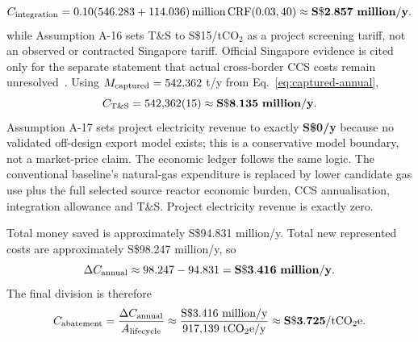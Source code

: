 \begin{equation}\label{eq:integration-cost}
C_{\rm integration}=0.10(546.283+114.036)\,\mathrm{million}\,\mathrm{CRF}(0.03,40)\approx\mathbf{S\$2.857~million/y}.
\end{equation}
while Assumption A-16 sets T\&S to S\$15/tCO$_2$ as a project screening tariff, not an observed or contracted Singapore tariff. Official Singapore evidence is cited only for the separate statement that actual cross-border CCS costs remain unresolved~\cite{mticcs2025cost}. Using $M_{\rm captured}=542{,}362$ t/y from Eq.~\ref{eq:captured-annual},
\begin{equation}\label{eq:ts-cost}
C_{\rm T\&S}=542{,}362(15)
\approx\mathbf{S\$8.135~million/y}.
\end{equation}
Assumption A-17 sets project electricity revenue to exactly \textbf{S\$0/y} because no validated off-design export model exists; this is a conservative model boundary, not a market-price claim.
The economic ledger follows the same logic. The conventional baseline's natural-gas expenditure is replaced by lower candidate gas use plus the full selected source reactor economic burden, CCS annualisation, integration allowance and T\&S. Project electricity revenue is exactly zero.

\begin{table}[htbp]\centering\scriptsize
\caption{Canonical annual-cost ledger generated by Rust for the zero-electricity-credit model boundary.}
\label{tab:cost-ledger}
\end{table}

Total money saved is approximately S\$94.831 million/y.  Total new represented costs are approximately S\$98.247 million/y, so
\begin{equation}\label{eq:annual-incremental-cost}
\Delta C_{\rm annual}
\approx98.247-94.831
=\mathbf{S\$3.416~million/y}.
\end{equation}
The final division is therefore
\begin{equation}\label{eq:abatement-cost-final}
C_{\rm abatement}
=\frac{\Delta C_{\rm annual}}{A_{\rm lifecycle}}
\approx\frac{\mathrm{S\$}3.416\ \mathrm{million/y}}{917{,}139\ \mathrm{tCO_2e/y}}
\approx\mathbf{S\$3.725/\mathrm{tCO_2e}}.
\end{equation}

